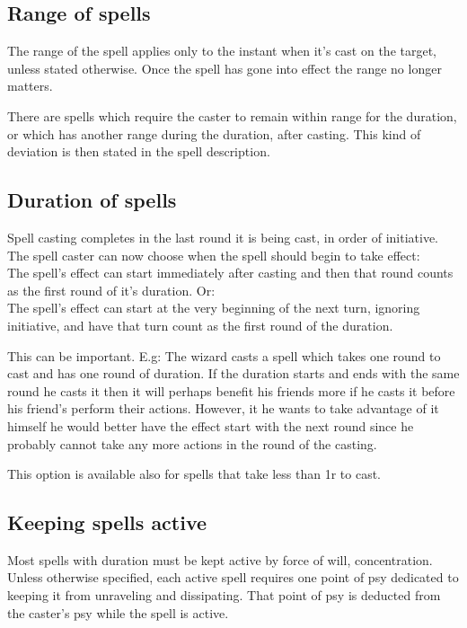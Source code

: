 \subsection*{Range of spells}
The range of the spell applies only to the instant when it's cast on the target, unless stated otherwise. Once the spell has gone into effect the range no longer matters. 

There are spells which require the caster to remain within range for the duration, or which has another range during the duration, after casting. This kind of deviation is then stated in the spell description.


\subsection*{Duration of spells}
Spell casting completes in the last round it is being cast, in order of initiative. The spell caster can now choose when the spell should begin to take effect: \\
The spell's effect can start immediately after casting and then that round counts as the first round of it's duration. Or: \\
The spell's effect can start at the very beginning of the next turn, ignoring initiative, and have that turn count as the first round of the duration.

This can be important. E.g: The wizard casts a spell which takes one round to cast and has one round of duration. If the duration starts and ends with the same round he casts it then it will perhaps benefit his friends more if he casts it before his friend's perform their actions. However, it he wants to take advantage of it himself he would better have the effect start with the next round since he probably cannot take any more actions in the round of the casting.

This option is available also for spells that take less than 1r to cast.


\subsection*{Keeping spells active}
Most spells with duration must be kept active by force of will, concentration. Unless otherwise specified, each active spell requires one point of psy dedicated to keeping it from unraveling and dissipating. That point of psy is deducted from the caster's psy while the spell is active.

